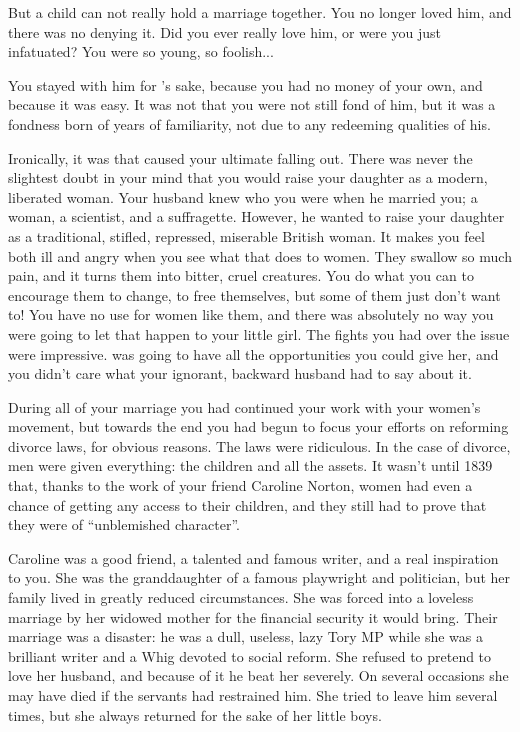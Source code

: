 \documentclass[char]{airship}
\begin{document}
But a child can not really hold a marriage together. You no longer
loved him, and there was no denying it. Did you ever really love him,
or were you just infatuated? You were so young, so foolish...

You stayed with him for \cThief{}'s sake, because you had no money of
your own, and because it was easy. It was not that you were not still
fond of him, but it was a fondness born of years of familiarity, not
due to any redeeming qualities of his.

Ironically, it was \cThief{} that caused your ultimate falling
out. There was never the slightest doubt in your mind that you would
raise your daughter as a modern, liberated woman. Your husband knew
who you were when he married you; a woman, a scientist, and a
suffragette. However, he wanted to raise your daughter as a
traditional, stifled, repressed, miserable British woman. It makes you
feel both ill and angry when you see what that does to women. They
swallow so much pain, and it turns them into bitter, cruel
creatures. You do what you can to encourage them to change, to free
themselves, but some of them just don't want to! You have no use for
women like them, and there was absolutely no way you were going to let
that happen to your little girl. The fights you had over the issue
were impressive. \cThief{} was going to have all the opportunities you
could give her, and you didn't care what your ignorant, backward
husband had to say about it.

During all of your marriage you had continued your work with your
women's movement, but towards the end you had begun to focus your
efforts on reforming divorce laws, for obvious reasons. The laws were
ridiculous. In the case of divorce, men were given everything: the
children and all the assets. It wasn't until 1839 that, thanks to the
work of your friend Caroline Norton, women had even a chance of
getting any access to their children, and they still had to prove that
they were of ``unblemished character''.

Caroline was a good friend, a talented and famous writer, and a real
inspiration to you. She was the granddaughter of a famous playwright
and politician, but her family lived in greatly reduced
circumstances. She was forced into a loveless marriage by her widowed
mother for the financial security it would bring. Their marriage was a
disaster: he was a dull, useless, lazy Tory MP while she was a
brilliant writer and a Whig devoted to social reform. She refused to
pretend to love her husband, and because of it he beat her
severely. On several occasions she may have died if the servants had
restrained him. She tried to leave him several times, but she always
returned for the sake of her little boys.
\end{document}
